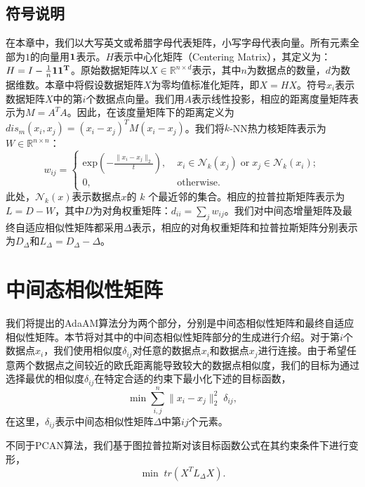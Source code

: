 \subsection{符号说明}
在本章中，我们以大写英文或希腊字母代表矩阵，小写字母代表向量。所有元素全部为$1$的向量用$\bf{1}$表示。$H$表示中心化矩阵（Centering Matrix），其定义为：$H = I-\frac{1}{n}\bf{1}\bf{1}^T$。原始数据矩阵以$X \in \mathbb{R}^{n\times d}$表示，其中$n$为数据点的数量，$d$为数据维数。本章中将假设数据矩阵$X$为零均值标准化矩阵，即$X = HX$。符号$x_i$表示数据矩阵$X$中的第$i$个数据点向量。我们用$A$表示线性投影，相应的距离度量矩阵表示为$M = A^TA$。因此，在该度量矩阵下的距离定义为$dis_m(x_i, x_j) = (x_i - x_j)^TM(x_i - x_j)$。我们将$k$-NN热力核矩阵表示为$W \in \mathbb{R}^{n \times n}$：
\begin{equation}
	w_{ij} = \begin{cases} \mathrm{exp}(-\frac{\|x_i-x_j\|_{2}}{t}), \; &x_i\in\mathcal{N}_k(x_j)\;\mathrm{or}\; x_j\in\mathcal{N}_k(x_i);\\
		0, &\mathrm{otherwise.}\end{cases}          
\end{equation}
此处，$\mathcal{N}_k(x)$表示数据点$x$的 $k$ 个最近邻的集合。相应的拉普拉斯矩阵表示为$L=D-W$，其中$D$为对角权重矩阵：$d_{ii} = \sum_j w_{ij}$。我们对中间态增量矩阵及最终自适应相似性矩阵都采用$\Delta$表示，相应的对角权重矩阵和拉普拉斯矩阵分别表示为$D_\Delta$和$L_\Delta = D_\Delta-\Delta$。

\section{中间态相似性矩阵}
我们将提出的AdaAM算法分为两个部分，分别是中间态相似性矩阵和最终自适应相似性矩阵。本节将对其中的中间态相似性矩阵部分的生成进行介绍。对于第$i$个数据点$x_i$，我们使用相似度$\delta_{ij}$对任意的数据点$x_i$和数据点$x_j$进行连接。由于希望任意两个数据点之间较近的欧氏距离能导致较大的数据点相似度，我们的目标为通过选择最优的相似度$\delta_{ij}$在特定合适的约束下最小化下述的目标函数，
\begin{equation}
	\mathop{\mathrm{min}} \sum_{i,j}^{n} \|x_i-x_j\|_2^2\;\delta_{ij},
\end{equation}
在这里，$\delta_{ij}$表示中间态相似性矩阵$\Delta$中第$ij$个元素。

不同于PCAN算法\cite{nie2014clustering}，我们基于图拉普拉斯对该目标函数公式在其约束条件下进行变形，
\begin{equation}
	\mathop{\mathrm{min}}\; tr(X^TL_\Delta X).
	\label{eq2:Delta}
\end{equation}

